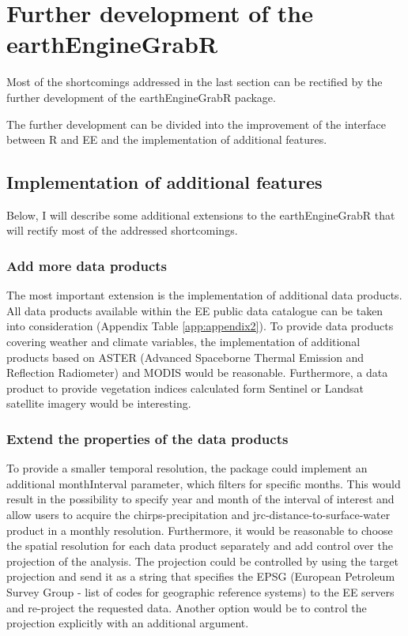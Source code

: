 \section{Further development of the earthEngineGrabR}

Most of the shortcomings addressed in the last section can be rectified by the further development of the earthEngineGrabR package. 

The further development can be divided into the improvement of the interface between R and EE and the implementation of additional features.

\subsection{Implementation of additional features}

Below, I will describe some additional extensions to the earthEngineGrabR that will rectify most of the addressed shortcomings.

\subsubsection{Add more data products}

The most important extension is the implementation of additional data products. All data products available within the EE public data catalogue can be taken into consideration (Appendix Table \ref{app:appendix2}). To provide data products covering weather and climate variables, the implementation of additional products based on ASTER (Advanced Spaceborne Thermal Emission and Reflection Radiometer) and MODIS would be reasonable. Furthermore, a data product to provide vegetation indices calculated form Sentinel or Landsat satellite imagery would be interesting.

\subsubsection{Extend the properties of the data products}
To provide a smaller temporal resolution, the package could implement an additional monthInterval parameter, which filters for specific months. This would result in the possibility to specify year and month of the interval of interest and allow users to acquire the chirps-precipitation and jrc-distance-to-surface-water product in a monthly resolution.
Furthermore, it would be reasonable to choose the spatial resolution for each data product separately and add control over the projection of the analysis. 
The projection could be controlled by using the target projection and send it as a string that specifies the EPSG (European Petroleum Survey Group - list of codes for geographic reference systems) to the EE servers and re-project the requested data. Another option would be to control the projection explicitly with an additional argument.

